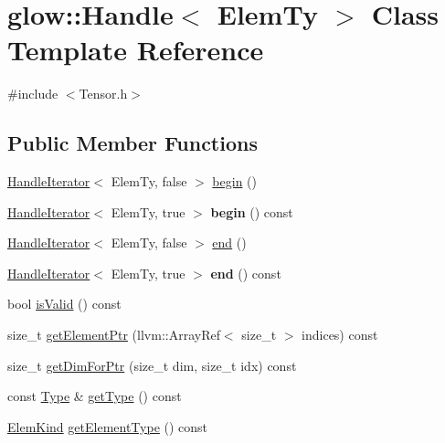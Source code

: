 \hypertarget{classglow_1_1_handle}{}\section{glow\+:\+:Handle$<$ Elem\+Ty $>$ Class Template Reference}
\label{classglow_1_1_handle}


{\ttfamily \#include $<$Tensor.\+h$>$}

\subsection*{Public Member Functions}
\begin{DoxyCompactItemize}
\item 
\hyperlink{classglow_1_1_handle_iterator}{Handle\+Iterator}$<$ Elem\+Ty, false $>$ \hyperlink{classglow_1_1_handle_a1870bb8d89827d3db93c0bf6500bda1f}{begin} ()
\item 
\mbox{\label{classglow_1_1_handle_a416d1e52f79b0719837637ba9f24edcb}} 
\hyperlink{classglow_1_1_handle_iterator}{Handle\+Iterator}$<$ Elem\+Ty, true $>$ {\bfseries begin} () const
\item 
\hyperlink{classglow_1_1_handle_iterator}{Handle\+Iterator}$<$ Elem\+Ty, false $>$ \hyperlink{classglow_1_1_handle_a9fb451dd6a54e840ff39a403a655097b}{end} ()
\item 
\mbox{\label{classglow_1_1_handle_a0e5540aa3fca1906bbe77343d36023dd}} 
\hyperlink{classglow_1_1_handle_iterator}{Handle\+Iterator}$<$ Elem\+Ty, true $>$ {\bfseries end} () const
\item 
bool \hyperlink{classglow_1_1_handle_ae201c577bfa7423f14722f365bbb8ddd}{is\+Valid} () const
\item 
size\+\_\+t \hyperlink{classglow_1_1_handle_aa2c31f9861ab398e8e244dde4bf7a122}{get\+Element\+Ptr} (llvm\+::\+Array\+Ref$<$ size\+\_\+t $>$ indices) const
\item 
size\+\_\+t \hyperlink{classglow_1_1_handle_ad3f6b264d70213e15a0f1fc8560b5a04}{get\+Dim\+For\+Ptr} (size\+\_\+t dim, size\+\_\+t idx) const
\item 
const \hyperlink{structglow_1_1_type}{Type} \& \hyperlink{classglow_1_1_handle_a012e00131edb5c3112c630c0e957c4cf}{get\+Type} () const
\item 
\hyperlink{namespaceglow_ab92e14a94329daf4083db670e95fbcdf}{Elem\+Kind} \hyperlink{classglow_1_1_handle_a2d71a692770a4dcb8654485d74965294}{get\+Element\+Type} () const

\end{DoxyCompactItemize}
